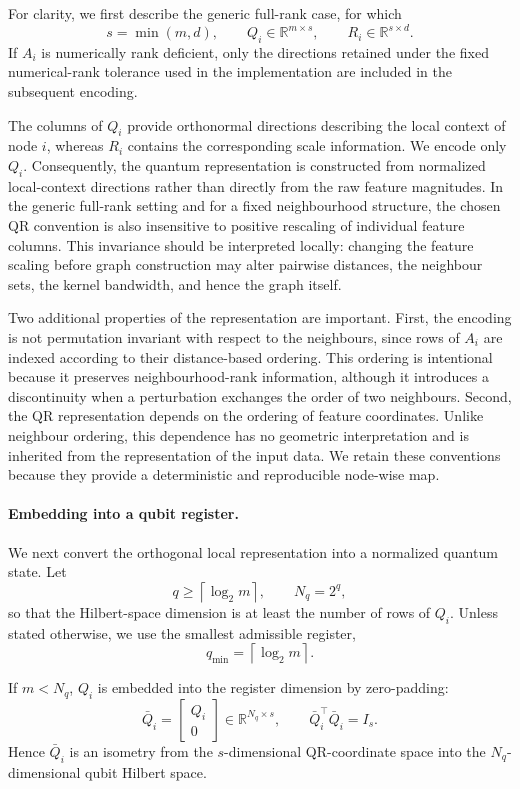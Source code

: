 \documentclass[11pt,a4paper]{article}
\begin{document}
For clarity, we first describe the generic full-rank case, for which
\[
s=\min(m,d),
\qquad
Q_i\in\mathbb{R}^{m\times s},
\qquad
R_i\in\mathbb{R}^{s\times d}.
\]
If \(A_i\) is numerically rank deficient, only the directions retained under
the fixed numerical-rank tolerance used in the implementation are included in
the subsequent encoding.

The columns of \(Q_i\) provide orthonormal directions describing the local
context of node \(i\), whereas \(R_i\) contains the corresponding scale
information. We encode only \(Q_i\). Consequently, the quantum representation
is constructed from normalized local-context directions rather than directly
from the raw feature magnitudes. In the generic full-rank setting and for a
fixed neighbourhood structure, the chosen QR convention is also insensitive
to positive rescaling of individual feature columns. This invariance should be
interpreted locally: changing the feature scaling before graph construction
may alter pairwise distances, the neighbour sets, the kernel bandwidth, and
hence the graph itself.

Two additional properties of the representation are important. First, the
encoding is not permutation invariant with respect to the neighbours, since
rows of \(A_i\) are indexed according to their distance-based ordering. This
ordering is intentional because it preserves neighbourhood-rank information,
although it introduces a discontinuity when a perturbation exchanges the
order of two neighbours. Second, the QR representation depends on the ordering
of feature coordinates. Unlike neighbour ordering, this dependence has no
geometric interpretation and is inherited from the representation of the
input data. We retain these conventions because they provide a deterministic
and reproducible node-wise map.

\paragraph{Embedding into a qubit register.}

We next convert the orthogonal local representation into a normalized quantum
state. Let
\[
q\geq
\left\lceil
\log_2 m
\right\rceil,
\qquad
N_q=2^q,
\]
so that the Hilbert-space dimension is at least the number of rows of
\(Q_i\). Unless stated otherwise, we use the smallest admissible register,
\[
q_{\min}
=
\left\lceil
\log_2 m
\right\rceil.
\]

If \(m<N_q\), \(Q_i\) is embedded into the register dimension by zero-padding:
\begin{equation}
\bar Q_i
=
\begin{bmatrix}
Q_i\\
0
\end{bmatrix}
\in
\mathbb{R}^{N_q\times s},
\qquad
\bar Q_i^\top\bar Q_i=I_s.
\label{eq:padded_qr}
\end{equation}
Hence \(\bar Q_i\) is an isometry from the \(s\)-dimensional QR-coordinate
space into the \(N_q\)-dimensional qubit Hilbert space.
\end{document}
